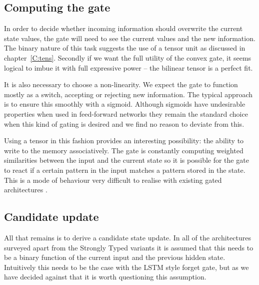 \subsection{Computing the gate}
In order to decide whether incoming information should
overwrite the current state values, the gate will need to see the current values and the new information.
The binary nature of this task suggests
the use of a tensor unit as discussed in chapter~\ref{C:tens}. Secondly if we want the full utility of
the convex gate, it seems logical to imbue it with full expressive power -- the bilinear tensor is a
perfect fit.

It is also necessary to choose a non-linearity. We expect the gate to function mostly as a switch,
accepting or rejecting new information. The
typical approach is to ensure this smoothly with a sigmoid. Although sigmoids have undesirable
properties when used in feed-forward networks \autocite{Glorot2010} they remain the standard choice
when this kind of gating is desired \autocite{VandenOord2016, Oord2016} and we find no reason to
deviate from this.

Using a tensor in this fashion provides an interesting possibility: the ability to write to the memory
associatively. The gate is constantly computing weighted similarities between
the input and the current state so it is possible for the gate to react if a certain pattern in the
input matches a pattern stored in the state. This is a mode of behaviour very difficult to realise
with existing gated architectures \autocite{Danihelka2016}.

\subsection{Candidate update}
All that remains is to derive a candidate state update. In all of the architectures
surveyed apart from the Strongly Typed variants \autocite{Balduzzi2016} it is assumed that this needs
to be a binary function of the current input and the previous hidden state. Intuitively this needs to
be the case with the LSTM style forget gate, but as we have decided against that it is worth questioning
this assumption.


